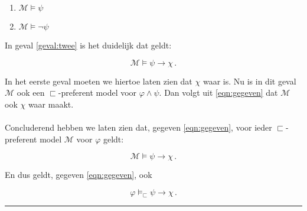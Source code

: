 \documentclass[a4paper,11pt]{article}
\begin{document}
\begin{enumerate}
\item\label{geval:een} $\mathcal{M} \vDash \psi$
\item\label{geval:twee} $\mathcal{M} \vDash \neg \psi$
\end{enumerate}

In geval \ref{geval:twee} is het duidelijk dat geldt:

\begin{displaymath}
\mathcal{M} \vDash \psi \rightarrow \chi \, \mbox{.}
\end{displaymath}

In het eerste geval moeten we hiertoe laten zien dat $\chi$ waar is. Nu is in
dit geval $\mathcal{M}$ ook een $\sqsubset$-preferent model voor $\varphi
\wedge \psi$. Dan volgt uit \ref{eqn:gegeven} dat $\mathcal{M}$ ook $\chi$
waar maakt.

\paragraph{}

Concluderend hebben we laten zien dat, gegeven \ref{eqn:gegeven}, voor ieder
$\sqsubset$-preferent model $\mathcal{M}$ voor $\varphi$ geldt:

\begin{displaymath}
\mathcal{M} \vDash \psi \rightarrow \chi \, \mbox{.}
\end{displaymath}

En dus geldt, gegeven \ref{eqn:gegeven}, ook

\begin{displaymath}
\varphi \vDash_{\sqsubset} \psi \rightarrow \chi \, \mbox{.}
\end{displaymath}

\hfill\rule{2.1mm}{2.mm}
\end{document}
